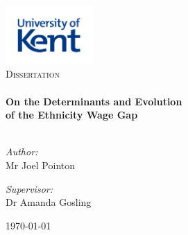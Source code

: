 \begin{titlepage}
\vbox{ }

\vbox{ }

\begin{center}
\includegraphics[width=0.25\textwidth]{./images/kent_logo.jpg}\\[1cm]
\textsc{\LARGE Dissertation}\\[1.5cm]

\vbox{ }
\HRule \\[0.4cm]
{ \huge \bfseries \linespread{1} On the Determinants and Evolution}\\[0.4cm]
{ \huge \bfseries \linespread{1} of the Ethnicity Wage Gap \vspace{-10pt}}\\[0.4cm]
\HRule \\[1.5cm]
\begin{minipage}{0.4\textwidth}
\begin{flushleft} \large
\emph{Author:}\\
Mr Joel Pointon
\end{flushleft}
\end{minipage}
\begin{minipage}{0.4\textwidth}
\begin{flushright} \large
\emph{Supervisor:} \\
Dr Amanda Gosling
\end{flushright}
\end{minipage}
\vfill
{\large \today}

\end{center}
\end{titlepage}